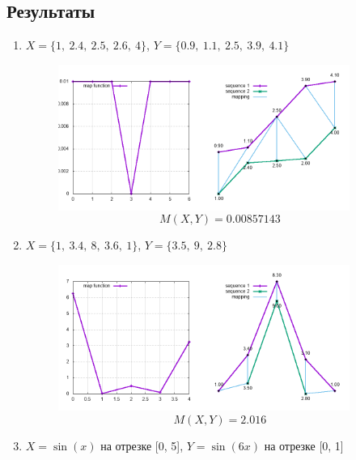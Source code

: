 \documentclass[12pt]{article}
\begin{document}
    \subsection{Результаты}
\begin{enumerate}
    \item $X = \{1,\ 2.4,\ 2.5,\ 2.6,\ 4\}$, $Y = \{0.9,\ 1.1,\ 2.5,\ 3.9,\ 4.1\} $

    \begin{figure}[h]
        \centering
        \includegraphics[scale=1.2, width=0.9\textwidth, height=0.425\textwidth]{simple}
        $$M(X, Y) = 0.00857143$$
    \end{figure}

    \item $X = \{1,\ 3.4,\ 8,\ 3.6,\ 1\}$, $Y = \{3.5,\ 9,\ 2.8\}$

    \begin{figure}[h]
        \centering
        \includegraphics[scale=1.2, width=0.9\textwidth, height=0.425\textwidth]{unequal}
        $$M(X, Y) = 2.016$$
    \end{figure}

\newpage

    \item $X = \sin(x)$ на отрезке [0, 5], $Y = \sin(6x)$ на отрезке [0, 1]


\end{enumerate}
\end{document}
